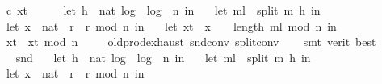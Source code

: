 \begin{isabellebody}
\ \ {\isacharparenleft}{\kern0pt}c{\isacharcomma}{\kern0pt}\ x{\isacharunderscore}{\kern0pt}t{\isacharprime}{\kern0pt}{\isacharparenright}{\kern0pt}{\isacharparenright}{\kern0pt}\isanewline
\ \ {\isacharequal}{\kern0pt}\ \isanewline
\ \ {\isacharparenleft}{\kern0pt}let\ h\ {\isacharequal}{\kern0pt}\ nat\ {\isasymlfloor}log\ {}\ {\isacharparenleft}{\kern0pt}log\ {}\ n{\isacharparenright}{\kern0pt}{\isasymrfloor}\ in\ \isanewline
\ \ let\ m{\isacharunderscore}{\kern0pt}l\ {\isacharequal}{\kern0pt}\ split\ m\ h\ in\ \isanewline
\ \ let\ {\isacharparenleft}{\kern0pt}x{\isacharunderscore}{\kern0pt}{}\ {\isacharcolon}{\kern0pt}{\isacharcolon}{\kern0pt}\ nat{\isacharparenright}{\kern0pt}\ {\isacharequal}{\kern0pt}\ {\isacharparenleft}{\kern0pt}r\ {\isacharasterisk}{\kern0pt}\ r{\isacharparenright}{\kern0pt}\ mod\ n\ in\ \isanewline
\ \ let\ x{\isacharunderscore}{\kern0pt}t{\isacharprime}{\kern0pt}\ {\isacharequal}{\kern0pt}\ x{\isacharunderscore}{\kern0pt}{}\ {\isacharcircum}{\kern0pt}\ {\isacharparenleft}{\kern0pt}{}\ {\isacharcircum}{\kern0pt}\ {\isacharparenleft}{\kern0pt}length\ m{\isacharunderscore}{\kern0pt}l{\isacharparenright}{\kern0pt}{\isacharparenright}{\kern0pt}\ mod\ n\ in\ \isanewline
\ \ x{\isacharunderscore}{\kern0pt}t{\isacharprime}{\kern0pt}\ {\isacharasterisk}{\kern0pt}\ x{\isacharunderscore}{\kern0pt}t{\isacharprime}{\kern0pt}\ mod\ n{\isacharparenright}{\kern0pt}{\isachardoublequoteclose}\ \isanewline
\ \ \isamarkupfalse%
\ old{\isachardot}{\kern0pt}prod{\isachardot}{\kern0pt}exhaust\ snd{\isacharunderscore}{\kern0pt}conv\ split{\isacharunderscore}{\kern0pt}conv\isanewline
\ \ \isamarkupfalse%
\ {\isacharparenleft}{\kern0pt}smt\ {\isacharparenleft}{\kern0pt}verit{\isacharcomma}{\kern0pt}\ best{\isacharparenright}{\kern0pt}{\isacharparenright}{\kern0pt}\ \isanewline
\isanewline
\ \ \isamarkupfalse%
\ \isamarkupfalse%
\ \ {\isachardoublequoteopen}snd\ {\isacharparenleft}{\kern0pt}\isanewline
\ \ let\ h\ {\isacharequal}{\kern0pt}\ nat\ {\isasymlfloor}log\ {}\ {\isacharparenleft}{\kern0pt}log\ {}\ n{\isacharparenright}{\kern0pt}{\isasymrfloor}\ in\ \isanewline
\ \ let\ m{\isacharunderscore}{\kern0pt}l\ {\isacharequal}{\kern0pt}\ split\ m\ h\ in\ \isanewline
\ \ let\ {\isacharparenleft}{\kern0pt}x{\isacharunderscore}{\kern0pt}{}\ {\isacharcolon}{\kern0pt}{\isacharcolon}{\kern0pt}\ nat{\isacharparenright}{\kern0pt}\ {\isacharequal}{\kern0pt}\ {\isacharparenleft}{\kern0pt}r\ {\isacharasterisk}{\kern0pt}\ r{\isacharparenright}{\kern0pt}\ mod\ n\ in\ \isanewline

\end{isabellebody}
